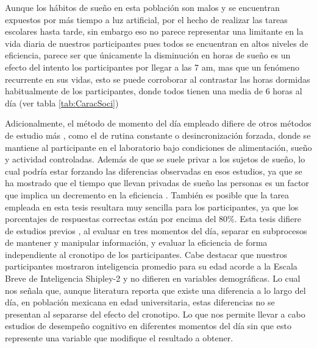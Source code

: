 \documentclass[12pt,letterpaper,final]{article}
\let\cite\cite %
\begin{document}
Aunque los hábitos de sueño en esta población son malos y se encuentran expuestos por más tiempo a luz artificial, por el hecho de realizar las tareas escolares hasta tarde, sin embargo eso no parece representar una limitante en la vida diaria de nuestros participantes pues todos se encuentran en altos niveles de eficiencia, parece ser que únicamente la disminución en horas de sueño es un efecto del intento los participantes por llegar a las 7 am, mas que un fenómeno recurrente en sus vidas, esto se puede corroborar al contrastar las horas dormidas habitualmente de los participantes, donde todos tienen una media de 6 horas al día (ver tabla \ref{tab:CaracSoci})  %



Adicionalmente, el método de momento del día empleado difiere de otros métodos de estudio más , como el de rutina constante o desincronización forzada, donde se mantiene al participante en el laboratorio bajo condiciones de alimentación, sueño y actividad controladas. Además de que se suele privar a los sujetos de sueño, lo cual podría estar forzando las diferencias observadas en esos estudios, ya que se ha mostrado que el tiempo que llevan privadas de sueño las personas es un factor que implica un decremento en la eficiencia \cite{Wright2002}. También es posible que la tarea empleada en esta tesis resultara muy sencilla para los participantes, ya que los porcentajes de respuestas correctas están por encima del 80\%.
Esta tesis difiere de estudios previos \cite{Baddeley1970,Schmidt2015}, al evaluar en tres momentos del día,  separar en subprocesos de mantener y manipular información, y evaluar la eficiencia de forma independiente al cronotipo de los participantes. Cabe destacar que nuestros participantes mostraron inteligencia promedio para su edad acorde a la Escala Breve de Inteligencia Shipley-2 \cite{Shipley2014} y no difieren en variables demográficas. Lo cual nos señala que, aunque literatura reporta que existe una diferencia a lo largo del día, en población mexicana en edad universitaria, estas diferencias no se presentan al separarse del efecto del cronotipo. Lo que nos permite llevar a cabo estudios de desempeño cognitivo en diferentes momentos del día sin que esto represente una variable que modifique el resultado a obtener. 
\end{document}
